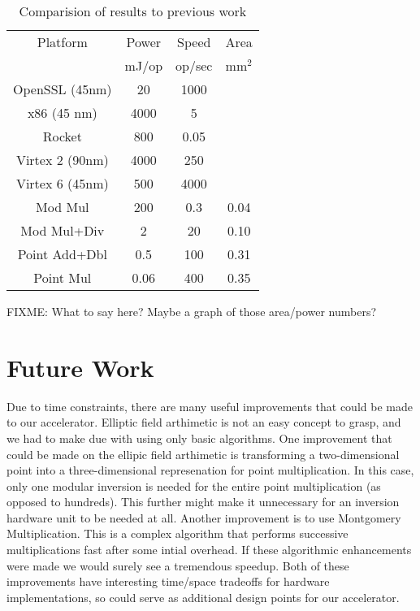 \documentclass[twocolumn]{article}
\begin{document}
\begin{table}[ht]
  \begin{center}
    \begin{tabular}{c|ccc}
      Platform        & Power & Speed  & Area \\
                      & mJ/op & op/sec & mm$^2$ \\
      \hline
      OpenSSL (45nm)  & 20    & 1000   &      \\
      x86 (45 nm)     & 4000  & 5      &      \\
      Rocket          & 800   & 0.05   &      \\
      Virtex 2 (90nm) & 4000  & 250    &      \\
      Virtex 6 (45nm) & 500   & 4000   &      \\
      \hline
      Mod Mul         & 200   & 0.3    & 0.04 \\
      Mod Mul+Div     & 2     & 20     & 0.10 \\
      Point Add+Dbl   & 0.5   & 100    & 0.31 \\
      Point Mul       & 0.06  & 400    & 0.35 \\
    \end{tabular}
  \end{center}

  \caption{Comparision of results to previous work
    \label{results}}
\end{table}

FIXME: What to say here?  Maybe a graph of those area/power numbers?

\section{Future Work}

Due to time constraints, there are many useful improvements that could be made
to our accelerator. Elliptic field arthimetic is not an easy concept to grasp, and
we had to make due with using only basic algorithms. One improvement that could be made
on the ellipic field arthimetic is transforming a two-dimensional point into a three-dimensional
represenation for point multiplication. In this case, only one modular inversion is needed
for the entire point multiplication (as opposed to hundreds). This further might make it 
unnecessary for an inversion hardware unit to be needed at all. Another improvement is to use
Montgomery Multiplication\cite{mmm-hw_ecc}. This is a complex algorithm that performs successive 
multiplications fast after some intial overhead. If these algorithmic enhancements were made we
would surely see a tremendous speedup. Both of these improvements have interesting time/space tradeoffs 
for hardware implementations, so could serve as additional design points for our accelerator.
\end{document}
